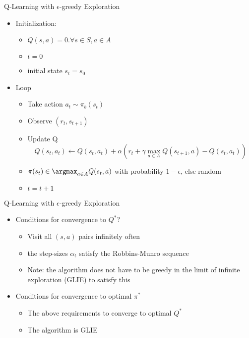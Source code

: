 \begin{frame}[c]{Q-Learning with $\epsilon$-greedy Exploration}
	
	\begin{itemize}
		\item Initialization:
		\begin{itemize}
			\item $Q(s,a)=0. \forall s \in S, a \in A$
			\item $t=0$
			\item initial state $s_t = s_0$
		\end{itemize} 
		\item Loop
		\begin{itemize}
			\item Take action $a_{t} \sim \pi_b(s_{t})$ 
			\item Observe $(r_{t}, s_{t+1})$
			\item Update Q 
			$$Q(s_t,a_t) \gets Q(s_t, a_t) + \alpha (r_t + \gamma \max_{a\in A} Q(s_{t+1}, a) - Q(s_t, a_t))$$
			\item $\pi(s_t) \in \argmax_{a\in A} Q(s_t, a)$ with probability $1-\epsilon$, else random
			\item $t = t+1$
		\end{itemize} 
	\end{itemize}
	
\end{frame}
\begin{frame}[c]{Q-Learning with $\epsilon$-greedy Exploration}
	
	\begin{itemize}
		\item Conditions for convergence to $Q^*$?
		\begin{itemize}
			\item Visit all $(s, a)$ pairs infinitely often
			\item the step-sizes $\alpha_t$ satisfy the Robbins-Munro sequence
			\item Note: the algorithm does not have to be greedy in the limit of infinite exploration (GLIE) to satisfy this
		\end{itemize}
		\bigskip
		\item Conditions for convergence to optimal $\pi^*$
		\begin{itemize}
			\item The above requirements to converge to optimal $Q^*$
			\item The algorithm is GLIE
		\end{itemize}
	\end{itemize}
	
\end{frame}


